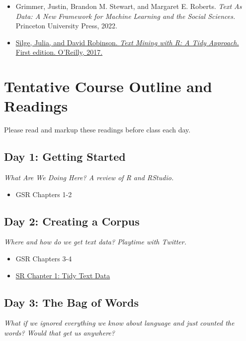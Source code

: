 \documentclass[11pt, letterpaper]{article}
\begin{document}
\begin{itemize}
\item Grimmer, Justin, Brandon M. Stewart, and Margaret E. Roberts. \textit{Text As Data: A New Framework for Machine Learning and the Social Sciences.} Princeton University Press, 2022.
\item \href{https://www.tidytextmining.com/index.html}{Silge, Julia, and David Robinson. \textit{Text Mining with R: A Tidy Approach.} First edition. O’Reilly, 2017.}
\end{itemize} 



\section*{Tentative Course Outline and Readings}

Please read and markup these readings before class each day.

\subsection*{Day 1: Getting Started}

\textit{What Are We Doing Here? A review of R and RStudio.}

\begin{itemize}
	\item GSR Chapters 1-2
\end{itemize}

\subsection*{Day 2: Creating a Corpus}

\textit{Where and how do we get text data? Playtime with Twitter.}

\begin{itemize}
	\item GSR Chapters 3-4
	\item \href{https://www.tidytextmining.com/tidytext.html}{SR Chapter 1: Tidy Text Data}
\end{itemize}

\subsection*{Day 3: The Bag of Words}

\textit{What if we ignored everything we know about language and just counted the words? Would that get us anywhere?}
\end{document}
